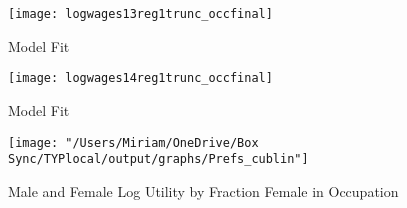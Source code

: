 \documentclass[12pt]{article}
\begin{document}
\begin{figure}[H]
\centering
\caption{Model Fit}
\label{fig:modelwages1}
\texttt{[image: logwages13reg1trunc\_occfinal]}
\end{figure}

\begin{figure}[H]
\centering
\caption{Model Fit}
\label{fig:modelwages2}
\texttt{[image: logwages14reg1trunc\_occfinal]}
\end{figure}

\begin{figure}[H]
\caption{Male and Female Log Utility by Fraction Female in Occupation}
\label{prefs}
\begin{center}
\texttt{[image: "/Users/Miriam/OneDrive/Box Sync/TYPlocal/output/graphs/Prefs\_cublin"]}
\end{center}
\end{figure}
\end{document}
